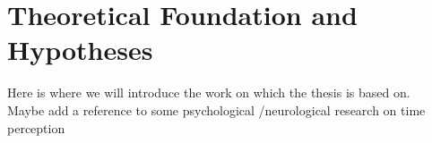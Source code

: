 
\chapter{Theoretical Foundation and Hypotheses}\label{ch:third}

Here is where we will introduce the work on which the thesis is based on. \\
Maybe add a reference to some psychological /neurological research on time perception 